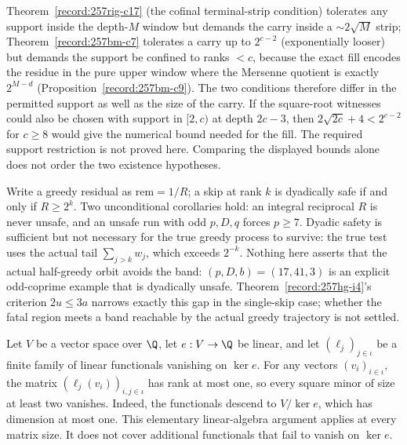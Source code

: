\begin{obs}\label{record:257rig-k7}
Theorem~\ref{record:257rig-c17} (the cofinal terminal-strip condition) tolerates any support inside the depth-$M$
window but demands the carry inside a $\sim2\sqrt M$ strip; Theorem~\ref{record:257bm-c7} tolerates a carry up to
$2^{c-2}$ (exponentially looser) but demands the support be confined to ranks $<c$, because the
exact fill encodes the residue in the pure upper window where the Mersenne quotient is exactly
$2^{M-d}$ (Proposition~\ref{record:257bm-c9}). The two conditions therefore differ in the permitted support as well as
the size of the carry.  If the square-root witnesses could also be chosen
with support in $[2,c)$ at depth $2c-3$, then
$2\sqrt{2c}+4<2^{c-2}$ for $c\ge8$ would give the numerical bound needed
for the fill.  The required support restriction is not proved here.
Comparing the displayed bounds alone does not order the two existence
hypotheses.
\par\noindent   {}
\end{obs}

\begin{obs}\label{record:257hg-k8}
Write a greedy residual as $\mathrm{rem}=1/R$; a skip at rank $k$ is dyadically safe if and
only if $R\ge2^k$.  Two unconditional corollaries hold: an integral reciprocal $R$ is never
unsafe, and an unsafe run with odd $p,D,q$ forces $p\ge7$.  Dyadic safety is sufficient but
not necessary for the true greedy process to survive: the true test uses the actual tail
$\sum_{j>k}w_j$, which exceeds $2^{-k}$.  Nothing here asserts that the actual half-greedy
orbit avoids the band: $(p,D,b)=(17,41,3)$ is an explicit odd-coprime example that is
dyadically unsafe.  Theorem~\ref{record:257hg-i4}'s criterion $2u\le3a$ narrows exactly this
gap in the single-skip case; whether the fatal region meets a band reachable by the actual
greedy trajectory is not settled.
\par\noindent   {}  
\end{obs}

\begin{thm}\label{record:257bm-k9}
Let $V$ be a vector space over $\Q$, let $e:V\to\Q$ be linear, and
let $(\ell_j)_{j\in\iota}$ be a finite family of linear functionals
vanishing on $\ker e$.  For any vectors $(v_i)_{i\in\iota}$, the matrix
$(\ell_j(v_i))_{i,j\in\iota}$ has rank at most one, so every square
minor of size at least two vanishes.
Indeed, the functionals descend to $V/\ker e$, which has dimension at
most one.  This elementary linear-algebra argument applies at every
matrix size.  It does not cover additional functionals that fail to
vanish on $\ker e$.
\end{thm}

